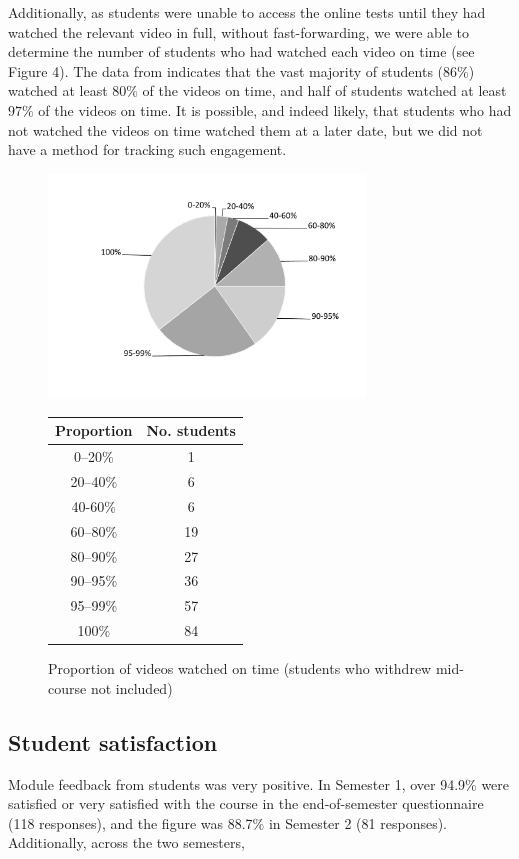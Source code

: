 \documentclass{amsart}
\begin{document}
Additionally, as students were unable to access the online tests until they had watched the relevant video in full, without fast-forwarding, we were able to determine the number of students who had watched each video on time (see Figure 4).  The data from indicates that the vast majority of students (86\%) watched at least $80\%$ of the videos on time, and half of students watched at least $97\%$ of the videos on time.  It is possible, and indeed likely, that students who had not watched the videos on time watched them at a later date, but we did not have a method for tracking such engagement.

\begin{center}
\begin{figure}[hbt]
\includegraphics[width=0.75\textwidth]{figure4.pdf}
\begin{tabular}{cc}
Proportion & No. students\\\hline
0--20\% & 1\\
20--40\% & 6\\
40-60\% & 6\\
60--80\% & 19\\
80--90\% & 27\\
90--95\% & 36\\
95--99\% & 57\\
100\% & 84
\end{tabular}
\caption{Proportion of videos watched on time (students who withdrew mid-course not included)}
\end{figure}
\end{center}

\subsection*{Student satisfaction}

Module feedback from students was very positive. In Semester 1, over 94.9\% were satisfied or very satisfied with the course in the end-of-semester questionnaire (118 responses), and the figure was 88.7\% in Semester 2 (81 responses). Additionally, across the two semesters,
\end{document}
